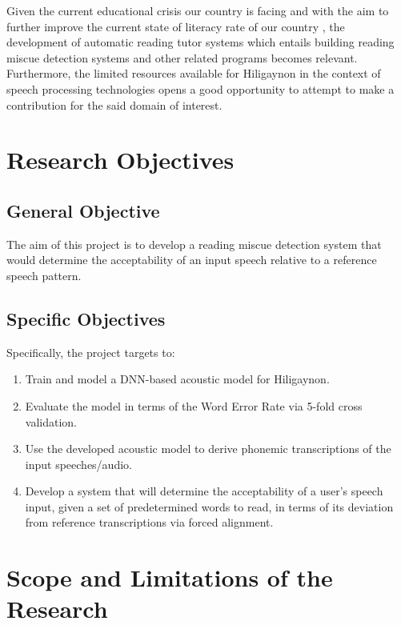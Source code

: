 Given the current educational crisis our country is facing \cite{unicef-2022} and with the aim to further improve the current state of  literacy rate of our country \cite{hernandez-2020}, the development of automatic reading tutor systems which entails building reading miscue detection systems and other related programs becomes relevant. Furthermore, the limited resources available for Hiligaynon in the context of speech processing technologies opens a good opportunity to attempt to make a contribution for the said domain of interest.

\section{Research Objectives}
\label{sec:researchobjectives}

\subsection{General Objective}
\label{sec:generalobjective}

The aim of this project is to develop a reading miscue detection system that would determine the acceptability of an input speech relative to a reference speech pattern.

\subsection{Specific Objectives}
\label{sec:specificobjectives}

Specifically, the project targets to:

\begin{enumerate}
   \item Train and model a DNN-based acoustic model for Hiligaynon.
   \item Evaluate the model in terms of the Word Error Rate via 5-fold cross validation.
   \item Use the developed acoustic model to derive phonemic transcriptions of the input speeches/audio.
   \item Develop a system that will determine the acceptability of a user's speech input, given a set of predetermined words to read, in terms of its deviation from reference transcriptions via forced alignment.
\end{enumerate}

\section{Scope and Limitations of the Research}
\label{sec:scopelimitations}

